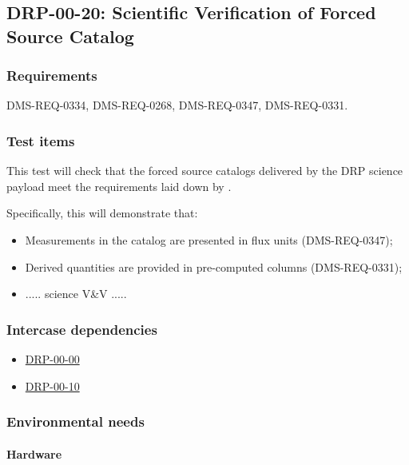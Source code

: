 \subsection{DRP-00-20: Scientific Verification of Forced Source Catalog}
\label{drp-00-20}

\subsubsection{Requirements}

DMS-REQ-0334, DMS-REQ-0268, DMS-REQ-0347, DMS-REQ-0331.

\subsubsection{Test items}
\label{drp-00-20-items}

This test will check that the forced source catalogs delivered by the DRP
science payload meet the requirements laid down by .

Specifically, this will demonstrate that:

\begin{itemize}

  \item{Measurements in the catalog are presented in flux units
  (DMS-REQ-0347);}
  \item{Derived quantities are provided in pre-computed columns
  (DMS-REQ-0331);}
  \item{..... science V\&V .....}

\end{itemize}

\subsubsection{Intercase dependencies}

\begin{itemize}

  \item{\hyperref[drp-00-00]{DRP-00-00}}
  \item{\hyperref[drp-00-10]{DRP-00-10}}

\end{itemize}

\subsubsection{Environmental needs}

\paragraph{Hardware}

